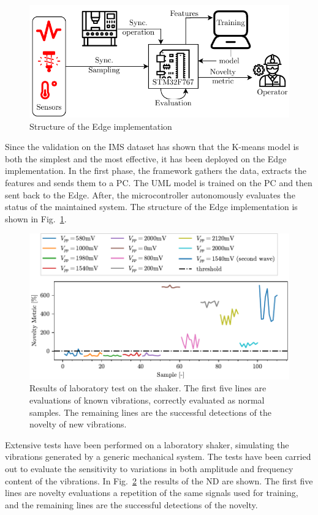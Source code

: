 \begin{figure}
    \includegraphics[width=\linewidth]{images/EmbeddedStructure.pdf}
    \caption{Structure of the Edge implementation}
    \label{fig:embedded}
\end{figure}

Since the validation on the IMS dataset has shown that the K-means model is both the simplest and the most effective, it has been deployed on the Edge implementation. In the first phase, the framework gathers the data, extracts the features and sends them to a PC. The UML model is trained on the PC and then sent back to the Edge. After, the microcontroller autonomously evaluates the status of the maintained system. The structure of the Edge implementation is shown in Fig.~\ref{fig:embedded}.

\begin{figure}
    \includegraphics[width=\linewidth]{images/Test02_LOF.pdf}
    \caption{Results of laboratory test on the shaker. The first five lines are evaluations of known vibrations, correctly evaluated as normal samples. The remaining lines are the successful detections of the novelty of new vibrations.}
    \label{fig:shaker}
\end{figure}

Extensive tests have been performed on a laboratory shaker, simulating the vibrations generated by a generic mechanical system. The tests have been carried out to evaluate the sensitivity to variations in both amplitude and frequency content of the vibrations. In Fig.~\ref{fig:shaker} the results of the ND are shown. The first five lines are novelty evaluations a repetition of the same signals used for training, and the remaining lines are the successful detections of the novelty.

